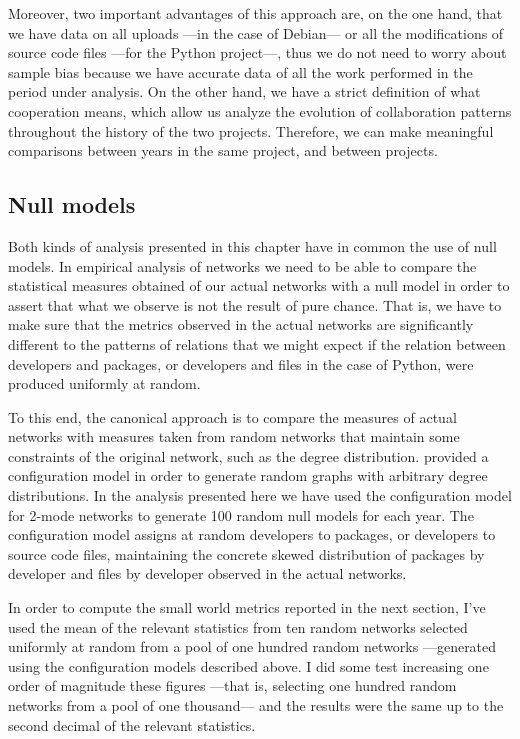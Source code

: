 Moreover, two important advantages of this approach are, on the one hand, that we have data on all uploads ---in the case of Debian--- or all the modifications of source code files ---for the Python project---, thus we do not need to worry about sample bias because we have accurate data of all the work performed in the period under analysis. On the other hand, we have a strict definition of what cooperation means, which allow us analyze the evolution of collaboration patterns throughout the history of the two projects. Therefore, we can make meaningful comparisons between years in the same project, and between projects.

\subsection{Null models}

Both kinds of analysis presented in this chapter have in common the use of null models. In empirical analysis of networks we need to be able to compare the statistical measures obtained of our actual networks with a null model in order to assert that what we observe is not the result of pure chance. That is, we have to make sure that the metrics observed in the actual networks are significantly different to the patterns of relations that we might expect if the relation between developers and packages, or developers and files in the case of Python, were produced uniformly at random.

To this end, the canonical approach is to compare the measures of actual networks with measures taken from random networks that maintain some constraints of the original network, such as the degree distribution. \citet*{newman:2003,nsw:2001} provided a configuration model in order to generate random graphs with arbitrary degree distributions. In the analysis presented here we have used the configuration model for 2-mode networks to generate 100 random null models for each year. The configuration model assigns at random developers to packages, or developers to source code files, maintaining the concrete skewed distribution of packages by developer and files by developer observed in the actual networks.

In order to compute the small world metrics reported in the next section, I've used the mean of the relevant statistics from ten random networks selected uniformly at random from a pool of one hundred random networks ---generated using the configuration models described above. I did some test increasing one order of magnitude these figures ---that is, selecting one hundred random networks from a pool of one thousand--- and the results were the same up to the second decimal of the relevant statistics.

